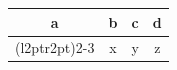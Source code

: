 \documentclass{article}
\begin{document}
\begin{tabular}{cccc}
\toprule[.5pt]
a & b & c & d \\
\cmidrule[.5pt](l{2pt}r{2pt}){2-3} & x & y & z\\
\bottomrule
\end{tabular}
\end{document}
